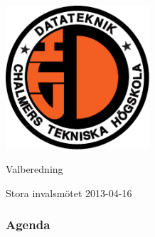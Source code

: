\documentclass[unicode, handout, 10pt, t,subsection=true]{beamer}
\begin{document}
\begin{frame}[c]
\begin{center}
\includegraphics[width=0.4\textwidth]{dteklogo}
\bigskip
\bfseries

{\LARGE Valberedning}

\smallskip

{\large Stora invalsmötet 2013-04-16}
\end{center}
\end{frame}


\begin{frame}
\frametitle{Agenda}
\begin{multicols}{2}
  \tableofcontents
\end{multicols}
\end{frame}






\end{document}
